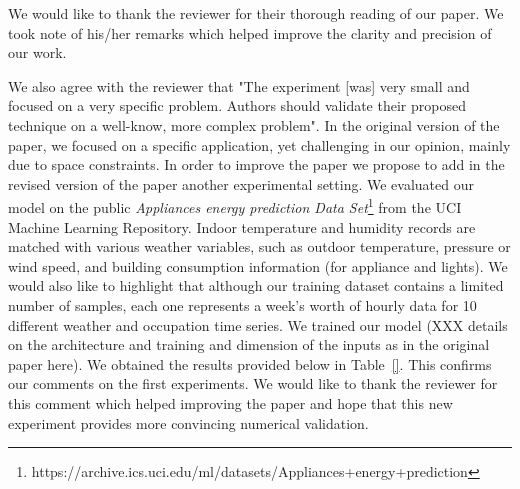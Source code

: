 \documentclass{article}
\title{}
\author{}
\date{}
\begin{document}
\maketitle




We would like to thank the reviewer for their thorough reading of our paper.
We took note of his/her remarks which helped improve the clarity and precision of our work.

We also agree with the reviewer that "The experiment [was] very small and focused
on a very specific problem. Authors should validate their proposed technique on a well-know, more complex problem". In the original version of the paper, we focused on a specific application, yet challenging in our opinion, mainly due to space constraints.  In order to improve the paper we propose to add in the revised version of the paper another experimental setting.  We evaluated our model on the public \textit{Appliances energy prediction Data Set}\footnote{https://archive.ics.uci.edu/ml/datasets/Appliances+energy+prediction} from the UCI Machine Learning Repository.
Indoor temperature and humidity records are matched with various weather variables, such as outdoor temperature, pressure or wind speed, and building consumption information (for appliance and lights). We would also like to highlight that although our training dataset contains a limited number of samples, each one represents a week's worth of hourly data for 10 different weather and occupation time series. We trained our model (XXX details on the architecture and training and dimension of the inputs as in the original paper here). We obtained the results provided below in Table~\ref{}. This confirms our comments on the first experiments.
We would like to thank the reviewer for this comment which helped improving the paper and hope that this new experiment provides more convincing numerical validation.
\end{document}
